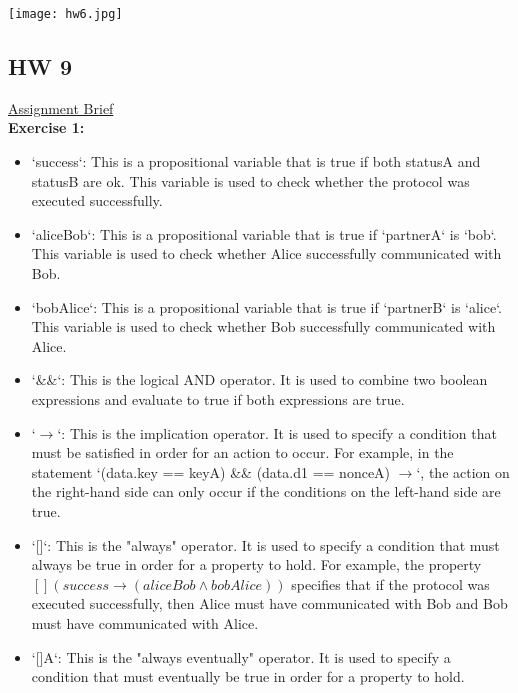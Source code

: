 \documentclass{article}
\theoremstyle{theorem}
\theoremstyle{definition}
\theoremstyle{remark}
\begin{document}
    \texttt{[image: hw6.jpg]}

\subsection{HW 9}

\href{https://github.com/alexhkurz/algorithm-analysis-2023/blob/main/resources/model-checking/Needham-Schroeder.md}{Assignment Brief}
\\

{\bf Exercise 1:}

\begin{itemize}
\item `success`: This is a propositional variable that is true if both statusA and statusB are ok. This variable is used to check whether the protocol was executed successfully.
\item `aliceBob`: This is a propositional variable that is true if `partnerA` is `bob`. This variable is used to check whether Alice successfully communicated with Bob.

\item `bobAlice`: This is a propositional variable that is true if `partnerB` is `alice`. This variable is used to check whether Bob successfully communicated with Alice.

\item `\&\&`: This is the logical AND operator. It is used to combine two boolean expressions and evaluate to true if both expressions are true.

\item `$\rightarrow$`: This is the implication operator. It is used to specify a condition that must be satisfied in order for an action to occur. For example, in the statement `(data.key == keyA) \&\& (data.d1 == nonceA) $\rightarrow$`, the action on the right-hand side can only occur if the conditions on the left-hand side are true.

\item `[]`: This is the "always" operator. It is used to specify a condition that must always be true in order for a property to hold. For example, the property $[] (success \rightarrow (aliceBob \land bobAlice))$ specifies that if the protocol was executed successfully, then Alice must have communicated with Bob and Bob must have communicated with Alice.

\item `[]A`: This is the "always eventually" operator. It is used to specify a condition that must eventually be true in order for a property to hold.

\end{itemize}
\end{document}
